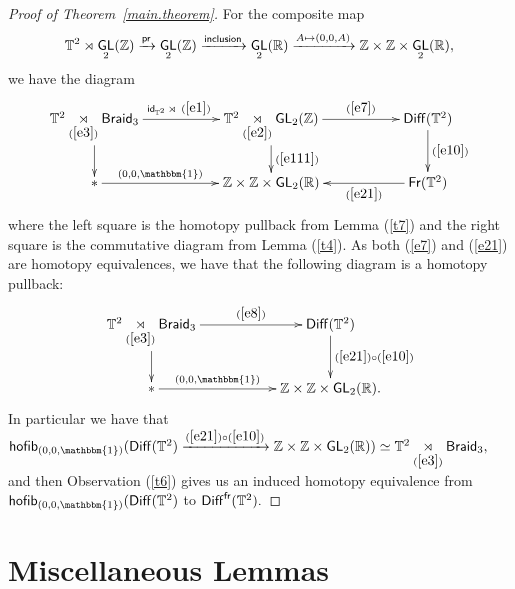 \documentclass{amsart}
\theoremstyle{definition}
\theoremstyle{remark}
\DeclareMathOperator{\Diff}{{\sf Diff}}
\newcommand{\xra}{\xrightarrow}
\DeclareMathOperator{\uno}{\mathbbm{1}}
\DeclareMathOperator{\Braid}{\sf Braid}
\DeclareMathOperator{\GL}{\sf GL}
\DeclareMathOperator{\Fr}{\sf Fr}
\DeclareMathOperator{\id}{\sf id}
\begin{document}
\begin{proof}[Proof of Theorem~\ref{main.theorem}]
For the composite map
\begin{equation}\label{e111}
\TT^{2} \rtimes \GL_{2}(\ZZ) \xra{\sf pr} \GL_{2}(\ZZ) \xra{\sf inclusion} \GL_{2}(\RR) \xra{A \mapsto (0,0,A)} \ZZ \times \ZZ \times \GL_{2}(\RR),
\end{equation}
we have the diagram
$$
\xymatrix{
\TT^2 
\underset{(\ref{e3})}\rtimes
\Braid_3
\ar[rr]^-{\id_{\TT^2}\rtimes ~(\ref{e1})~} \ar[d]
&&
\TT^2 \underset{(\ref{e2})}\rtimes \GL_2(\ZZ) \ar[d]^-{(\ref{e111})} \ar[rr]^-{(\ref{e7})}
&& 
\Diff(\TT^{2}) \ar[d]^-{(\ref{e10})}
\\
\ast \ar[rr]^-{(0, 0, \uno)}
&&
\ZZ \times \ZZ \times \GL_2(\RR) 
&&
\Fr(\TT^{2}) \ar[ll]^-{(\ref{e21})}
}$$
where the left square is the homotopy pullback from Lemma (\ref{t7}) and the right square is the commutative diagram from Lemma (\ref{t4}). As both (\ref{e7}) and (\ref{e21}) are homotopy equivalences, we have that the following diagram is a homotopy pullback:
$$
\xymatrix{
\TT^2 \underset{(\ref{e3})}\rtimes \Braid_3  \ar[rr]^-{(\ref{e8})} \ar[d]
&&
\Diff(\TT^2) \ar[d]^-{(\ref{e21}) \circ (\ref{e10})}
\\
\ast \ar[rr]^-{(0, 0, \uno)}
&&
\ZZ \times \ZZ \times \GL_2(\RR) 
.
}
$$
In particular we have that ${\sf hofib}_{(0, 0, \uno)}(\Diff(\TT^{2})\xra{(\ref{e21}) \circ (\ref{e10})} \ZZ \times \ZZ \times \GL_{2}(\RR)) \simeq \TT^2 \underset{(\ref{e3})}\rtimes \Braid_3,$ and then Observation (\ref{t6}) gives us an induced homotopy equivalence from ${\sf hofib}_{(0, 0, \uno)}(\Diff(\TT^{2})$ to $\Diff^{\sf fr}(\TT^{2}).$


\end{proof}



\section*{Miscellaneous Lemmas}
\end{document}
